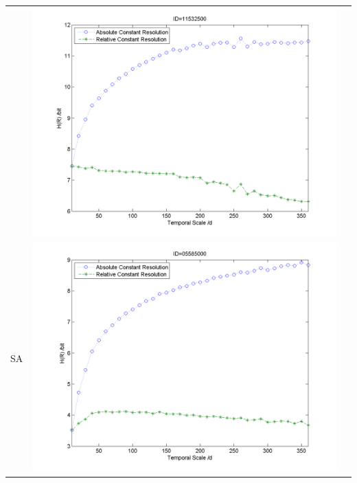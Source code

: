 \documentclass[11pt]{article}
\begin{document}
\begin{table}[H]
{\begin{tabular}{ccc}
&\begin{minipage}{.6\textwidth}\includegraphics[width=\linewidth]{resultgraph/e11532500.png}\end{minipage}
\\
SA
&\begin{minipage}{.6\textwidth}\includegraphics[width=\linewidth]{resultgraph/e05585000.png}\end{minipage}


\end{tabular}}
\end{table}
\end{document}
